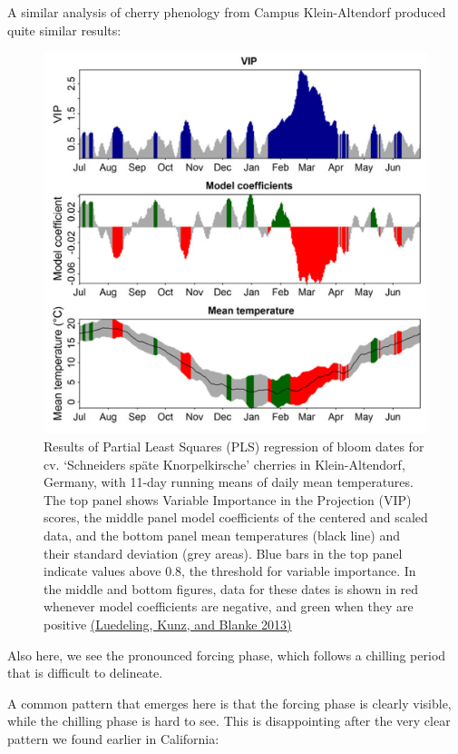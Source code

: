 \documentclass[
]{book}
\begin{document}
A similar analysis of cherry phenology from Campus Klein-Altendorf produced quite similar results:

\begin{figure}
\centering
\includegraphics{pictures/PLS_CKA_cherries.png}
\caption{Results of Partial Least Squares (PLS) regression of bloom dates for cv. `Schneiders späte Knorpelkirsche' cherries in Klein-Altendorf, Germany, with 11-day running means of daily mean temperatures. The top panel shows Variable Importance in the Projection (VIP) scores, the middle panel model coefficients of the centered and scaled data, and the bottom panel mean temperatures (black line) and their standard deviation (grey areas). Blue bars in the top panel indicate values above 0.8, the threshold for variable importance. In the middle and bottom figures, data for these dates is shown in red whenever model coefficients are negative, and green when they are positive \href{https://link.springer.com/article/10.1007/s00484-012-0594-y}{(Luedeling, Kunz, and Blanke \protect\hyperlink{ref-luedeling2013identification}{2013})}}
\end{figure}

Also here, we see the pronounced forcing phase, which follows a chilling period that is difficult to delineate.

A common pattern that emerges here is that the forcing phase is clearly visible, while the chilling phase is hard to see. This is disappointing after the very clear pattern we found earlier in California:
\end{document}
